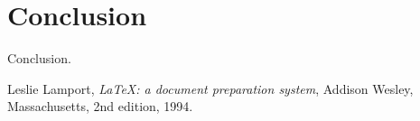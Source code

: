 \documentclass[12pt]{article}
\begin{document}
    \section {Conclusion}
    
    Conclusion.
    
    
    \begin{thebibliography}{9}
            Leslie Lamport,
            \textit{\LaTeX: a document preparation system},
            Addison Wesley, Massachusetts,
            2nd edition,
            1994.
    \end{thebibliography}
    
    
\end{document}
